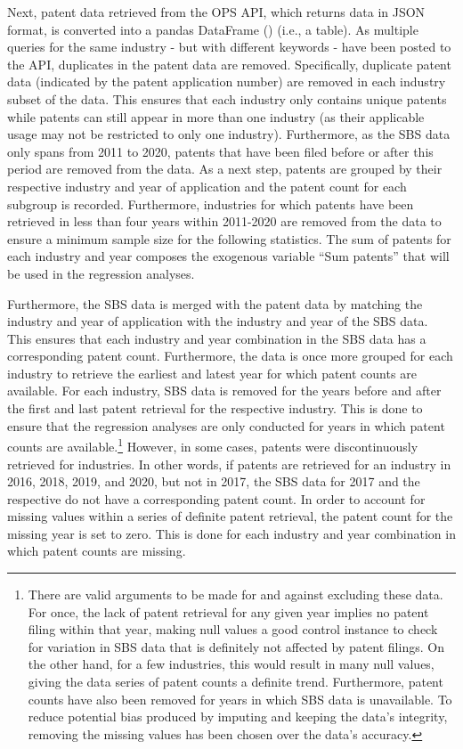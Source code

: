 \documentclass[
  11,
  a4paperpaper,
]{article}
\begin{document}
Next, patent data retrieved from the OPS API, which returns data in JSON
format, is converted into a pandas DataFrame
() (i.e., a table). As multiple queries for
the same industry - but with different keywords - have been posted to
the API, duplicates in the patent data are removed. Specifically,
duplicate patent data (indicated by the patent application number) are
removed in each industry subset of the data. This ensures that each
industry only contains unique patents while patents can still appear in
more than one industry (as their applicable usage may not be restricted
to only one industry). Furthermore, as the SBS data only spans from 2011
to 2020, patents that have been filed before or after this period are
removed from the data. As a next step, patents are grouped by their
respective industry and year of application and the patent count for
each subgroup is recorded. Furthermore, industries for which patents
have been retrieved in less than four years within 2011-2020 are removed
from the data to ensure a minimum sample size for the following
statistics. The sum of patents for each industry and year composes the
exogenous variable ``Sum patents'' that will be used in the regression
analyses.

Furthermore, the SBS data is merged with the patent data by matching the
industry and year of application with the industry and year of the SBS
data. This ensures that each industry and year combination in the SBS
data has a corresponding patent count. Furthermore, the data is once
more grouped for each industry to retrieve the earliest and latest year
for which patent counts are available. For each industry, SBS data is
removed for the years before and after the first and last patent
retrieval for the respective industry. This is done to ensure that the
regression analyses are only conducted for years in which patent counts
are available.\footnote{There are valid arguments to be made for and
  against excluding these data. For once, the lack of patent retrieval
  for any given year implies no patent filing within that year, making
  null values a good control instance to check for variation in SBS data
  that is definitely not affected by patent filings. On the other hand,
  for a few industries, this would result in many null values, giving
  the data series of patent counts a definite trend. Furthermore, patent
  counts have also been removed for years in which SBS data is
  unavailable. To reduce potential bias produced by imputing and keeping
  the data's integrity, removing the missing values has been chosen over
  the data's accuracy.} However, in some cases, patents were
discontinuously retrieved for industries. In other words, if patents are
retrieved for an industry in 2016, 2018, 2019, and 2020, but not in
2017, the SBS data for 2017 and the respective do not have a
corresponding patent count. In order to account for missing values
within a series of definite patent retrieval, the patent count for the
missing year is set to zero. This is done for each industry and year
combination in which patent counts are missing.
\end{document}
